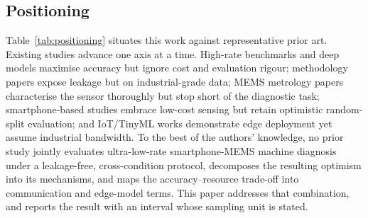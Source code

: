\subsection{Positioning}
Table~\ref{tab:positioning} situates this work against representative prior art.
Existing studies advance one axis at a time. High-rate benchmarks and deep models
maximise accuracy but ignore cost and evaluation rigour; methodology papers expose
leakage but on industrial-grade data; MEMS metrology papers characterise the
sensor thoroughly but stop short of the diagnostic task; smartphone-based studies
embrace low-cost sensing but retain optimistic random-split evaluation; and
IoT/TinyML works demonstrate edge deployment yet assume industrial bandwidth. To
the best of the authors' knowledge, no prior study jointly evaluates ultra-low-rate
smartphone-MEMS machine diagnosis under a leakage-free, cross-condition protocol,
decomposes the resulting optimism into its mechanisms, and maps the
accuracy--resource trade-off into communication and edge-model terms. This paper
addresses that combination, and reports the result with an interval whose sampling
unit is stated.

